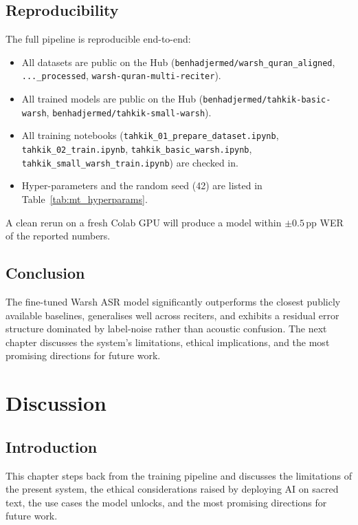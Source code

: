 \documentclass[12pt,a4paper]{report}
\begin{document}
\section{Reproducibility}

The full pipeline is reproducible end-to-end:

\begin{itemize}
  \item All datasets are public on the Hub
        (\texttt{benhadjermed/warsh\_quran\_aligned},
        \texttt{...\_processed},
        \texttt{warsh-quran-multi-reciter}).
  \item All trained models are public on the Hub
        (\texttt{benhadjermed/tahkik-basic-warsh},
        \texttt{benhadjermed/tahkik-small-warsh}).
  \item All training notebooks
        (\texttt{tahkik\_01\_prepare\_dataset.ipynb},
        \texttt{tahkik\_02\_train.ipynb},
        \texttt{tahkik\_basic\_warsh.ipynb},
        \texttt{tahkik\_small\_warsh\_train.ipynb}) are checked in.
  \item Hyper-parameters and the random seed (42) are listed in
        Table~\ref{tab:mt_hyperparams}.
\end{itemize}

A clean rerun on a fresh Colab GPU will produce a model within
$\pm 0.5$\,pp WER of the reported numbers.

\section{Conclusion}
The fine-tuned Warsh ASR model significantly outperforms the closest
publicly available baselines, generalises well across reciters, and
exhibits a residual error structure dominated by label-noise rather
than acoustic confusion. The next chapter discusses the system's
limitations, ethical implications, and the most promising directions
for future work.

\chapter{Discussion}
\label{ch:mt_discussion}

\section{Introduction}
This chapter steps back from the training pipeline and discusses the
limitations of the present system, the ethical considerations raised by
deploying AI on sacred text, the use cases the model unlocks, and the
most promising directions for future work.
\end{document}
